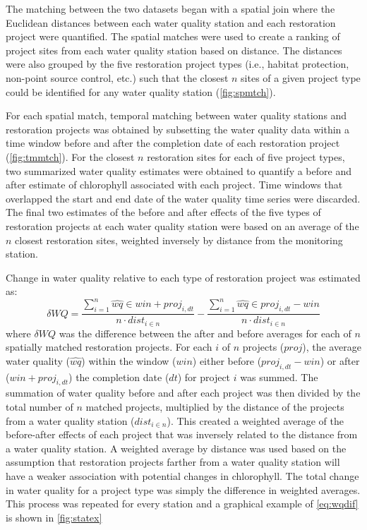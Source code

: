 \documentclass[]{article}
\begin{document}
The matching between the two datasets began with a spatial join where
the Euclidean distances between each water quality station and each
restoration project were quantified. The spatial matches were used to
create a ranking of project sites from each water quality station based
on distance. The distances were also grouped by the five restoration
project types (i.e., habitat protection, non-point source control, etc.)
such that the closest \(n\) sites of a given project type could be
identified for any water quality station (\cref{fig:spmtch}).

For each spatial match, temporal matching between water quality stations
and restoration projects was obtained by subsetting the water quality
data within a time window before and after the completion date of each
restoration project (\cref{fig:tmmtch}). For the closest \(n\)
restoration sites for each of five project types, two summarized water
quality estimates were obtained to quantify a before and after estimate
of chlorophyll associated with each project. Time windows that
overlapped the start and end date of the water quality time series were
discarded. The final two estimates of the before and after effects of
the five types of restoration projects at each water quality station
were based on an average of the \(n\) closest restoration sites,
weighted inversely by distance from the monitoring station.

Change in water quality relative to each type of restoration project was
estimated as: \begin{equation}
\delta WQ = \frac{\sum_{i = 1}^{n} \hat{wq} \in win + proj_{i, dt}}{n \cdot dist_{i \in n}} - \frac{\sum_{i = 1}^{n} \hat{wq} \in proj_{i, dt} - win}{n \cdot dist_{i \in n}}
\label{eq:wqdif}
\end{equation} where \(\delta WQ\) was the difference between the after
and before averages for each of \(n\) spatially matched restoration
projects. For each \(i\) of \(n\) projects (\(proj\)), the average water
quality (\(\hat{wq}\)) within the window (\(win\)) either before
(\(proj_{i, dt} - win\)) or after (\(win + proj_{i, dt}\)) the
completion date (\(dt\)) for project \(i\) was summed. The summation of
water quality before and after each project was then divided by the
total number of \(n\) matched projects, multiplied by the distance of
the projects from a water quality station (\(dist_{i \in n}\)). This
created a weighted average of the before-after effects of each project
that was inversely related to the distance from a water quality station.
A weighted average by distance was used based on the assumption that
restoration projects farther from a water quality station will have a
weaker association with potential changes in chlorophyll. The total
change in water quality for a project type was simply the difference in
weighted averages. This process was repeated for every station and a
graphical example of \cref{eq:wqdif} is shown in \cref{fig:statex}
\end{document}
